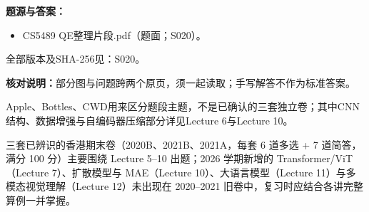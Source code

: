 \textbf{题源与答案：}

\begin{itemize}

\item CS5489 QE整理片段.pdf（题面；S020）。

\end{itemize}

全部版本及SHA-256见：S020。

\textbf{核对说明：}部分图与问题跨两个原页，须一起读取；手写解答不作为标准答案。

Apple、Bottles、CWD用来区分题段主题，不是已确认的三套独立卷；其中CNN结构、数据增强与自编码器压缩部分详见Lecture 6与Lecture 10。



三套已辨识的香港期末卷（2020B、2021B、2021A，每套 6 道多选 + 7 道简答，满分 100 分）主要围绕 Lecture 5–10 出题；2026 学期新增的 Transformer/ViT（Lecture 7）、扩散模型与 MAE（Lecture 10）、大语言模型（Lecture 11）与多模态视觉理解（Lecture 12）未出现在 2020–2021 旧卷中，复习时应结合各讲完整算例一并掌握。

